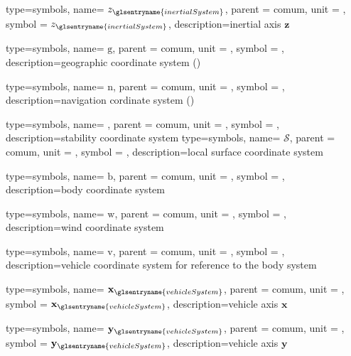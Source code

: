 {type=symbols,
  name= \ensuremath{z_{\glsentryname{inertialSystem}}},
  parent = {comum},
  unit = \unexpanded{},
  symbol = \ensuremath{z_{\glsentryname{inertialSystem}}},
  description={inertial axis $\mathbf{z}$}
}

{type=symbols,
  name= \ensuremath{\mathrm{g}},
  parent = {comum},
  unit = \unexpanded{},
  symbol = ,
  description={geographic coordinate system ()}
}

{type=symbols,
  name= \ensuremath{\mathrm{n}},
  parent = {comum},
  unit = \unexpanded{},
  symbol = ,
  description={navigation cordinate system  ()}
}



{type=symbols,
  name= \ensuremath{\mathrm{}},
  parent = {comum},
  unit = \unexpanded{},
  symbol = ,
  description={stability coordinate system}
}
{type=symbols,
  name= \ensuremath{\mathcal{S}},
  parent = {comum},
  unit = \unexpanded{},
  symbol = ,
  description={local surface coordinate system}
}

{type=symbols,
  name= \ensuremath{\mathrm{b}},
  parent = {comum},
  unit = \unexpanded{},
  symbol = ,
  description={body coordinate system}
}

{type=symbols,
  name= \ensuremath{\mathrm{w}},
  parent = {comum},
  unit = \unexpanded{},
  symbol = ,
  description={wind coordinate system}
}

{type=symbols,
  name= \ensuremath{\mathrm{v}},
  parent = {comum},
  unit = \unexpanded{},
  symbol = ,
  description={vehicle coordinate system for reference to the body system}
}




{type=symbols,
  name= \ensuremath{\mathbf{x}_{\glsentryname{vehicleSystem}}},
  parent = {comum},
  unit = \unexpanded{},
  symbol = \ensuremath{\mathbf{x}_{\glsentryname{vehicleSystem}}},
  description={vehicle axis $\mathbf{x}$}
}

{type=symbols,
  name= \ensuremath{\mathbf{y}_{\glsentryname{vehicleSystem}}},
  parent = {comum},
  unit = \unexpanded{},
  symbol = \ensuremath{\mathbf{y}_{\glsentryname{vehicleSystem}}},
  description={vehicle axis $\mathbf{y}$}
}



